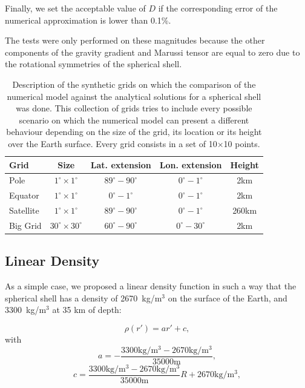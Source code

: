 \documentclass[extra]{gji}
\begin{document}
Finally, we set the acceptable value of $D$ if the corresponding error of the numerical approximation is lower than 0.1\%.

The tests were only performed on these magnitudes because the other components of the gravity gradient and Marussi tensor are equal to zero due to the rotational symmetries of the spherical shell.

\begin{table}
\caption{
    Description of the synthetic grids on which the comparison of the numerical model against the analytical solutions for a spherical shell was done. This collection of grids tries to include every possible scenario on which the numerical model can present a different behaviour depending on the size of the grid, its location or its height over the Earth surface. Every grid consists in a set of 10$\times$10 points.
}
\label{tab:grids}
\begin{tabular}{lcccc}
    Grid & Size & Lat. extension & Lon. extension & Height \\ \hline
    Pole & $1^\circ \times 1^\circ$ & $89^\circ - 90^\circ$ & $0^\circ - 1^\circ$ & 2km \\
    Equator & $1^\circ \times 1^\circ$ & $0^\circ - 1^\circ$ & $0^\circ - 1^\circ$ & 2km \\
    Satellite & $1^\circ \times 1^\circ$ & $89^\circ - 90^\circ$ & $0^\circ - 1^\circ$ & 260km \\
    Big Grid & $30^\circ \times 30^\circ$ & $60^\circ - 90^\circ$ & $0^\circ - 30^\circ$ & 2km \\
\end{tabular}
\end{table}


\subsection{Linear Density}

As a simple case, we proposed a linear density function in such a way that the spherical shell has a density of 2670~kg/m$^3$ on the surface of the Earth, and 3300~kg/m$^3$ at 35 km of depth:

\begin{equation}
    \rho(r') = ar' + c,
    \label{eq:density-linear}
\end{equation}
\noindent with 
\begin{equation}
    a = -\frac{3300\text{kg/m$^3$} - 2670\text{kg/m$^3$}}{35000\text{m}},
\end{equation}
\begin{equation}
    c = \frac{3300\text{kg/m$^3$} - 
        2670\text{kg/m$^3$}}{35000\text{m}} R + 
        2670\text{kg/m$^3$},
\end{equation}
\end{document}
